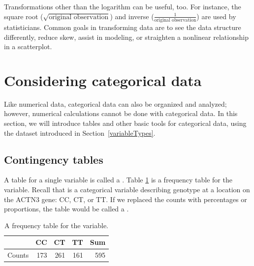 \begin{doublespace}
Transformations other than the logarithm can be useful, too. For instance, the square root ($\sqrt{\text{original observation}}$) and inverse ($\frac{1}{\text{original observation}}$) are used by statisticians. Common goals in transforming data are to see the data structure differently, reduce skew, assist in modeling, or straighten a nonlinear relationship in a scatterplot.


\textC{\newpage}


\section[Considering categorical data]{Considering categorical data }
\label{categoricalData}


Like numerical data, categorical data can also be organized and analyzed; however, numerical calculations cannot be done with categorical data. In this section, we will introduce tables and other basic tools for categorical data, using the  dataset introduced in Section~\ref{variableTypes}. 

\subsection{Contingency tables}
A table for a single variable is called a . Table \ref{famussFrequencyTable} is a frequency table for the  variable. Recall that  is a categorical variable describing genotype at a location on the ACTN3 gene: CC, CT, or TT. If we replaced the counts with percentages or proportions, the table would be called a .

\begin{table}[ht]
	\centering
	\begin{tabular}{rrrrr}
		\hline
		& CC & CT & TT & Sum \\ 
		\hline
		Counts & 173 & 261 & 161 & 595 \\ 
		\hline
	\end{tabular}
	\caption{A frequency table for the  variable.} 
	\label{famussFrequencyTable}
\end{table}


\end{doublespace}
